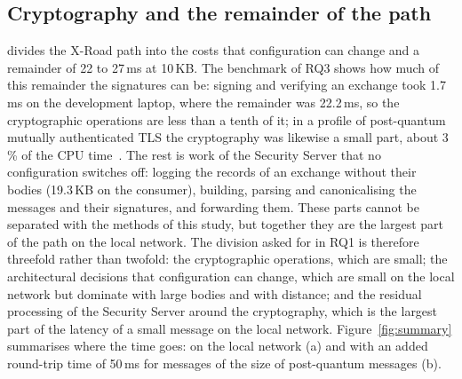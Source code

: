 \documentclass[conference,a4paper]{IEEEtran}
\newcommand{\newtext}[1]{{\color{blue}#1}}
\begin{document}
\subsection{\newtext{Cryptography and the remainder of the path}}\label{sec:remainder}

\newtext{\newtext{Figure~\ref{fig:division}} divides the X-Road path into the costs that configuration can
change and a remainder of 22 to 27\,ms at 10\,KB. The benchmark of RQ3 shows how much of this
remainder the signatures can be: signing and verifying an exchange took 1.7\,ms on the development
laptop, where the remainder was 22.2\,ms, so the cryptographic operations are less than a tenth of
it; in a profile of post-quantum mutually authenticated TLS the cryptography was likewise a small
part, about 3\,\% of the CPU time~\cite{rahul2026}. The rest is work of the Security Server that no configuration switches off: logging the records
of an exchange without their bodies (19.3\,KB on the consumer), building, parsing and canonicalising
the messages and their signatures, and forwarding them. These parts cannot be separated with the
methods of this study, but together they are the largest part of the path on the local network. The
division asked for in RQ1 is therefore threefold rather than twofold: the cryptographic operations,
which are small; the architectural decisions that configuration can change, which are small on the
local network but dominate with large bodies and with distance; and the \newtext{residual processing} of the
Security Server around the cryptography, which is the largest part of the latency of a small message
on the local network.} \newtext{Figure~\ref{fig:summary} summarises where the time goes: on the
local network (a) and with an added round-trip time of 50\,ms for messages of the size of
post-quantum messages (b).}
\end{document}
